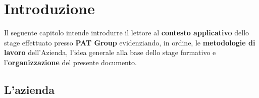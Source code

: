 
\chapter{Introduzione}
\label{cap:introduzione}

Il seguente capitolo intende introdurre il lettore al \textbf{contesto applicativo} dello stage effettuato presso \textbf{PAT Group} evidenziando, in ordine, le \textbf{metodologie di lavoro} dell'Azienda, l'idea generale alla base dello stage formativo e l'\textbf{organizzazione} del presente documento.




\section{L'azienda}

